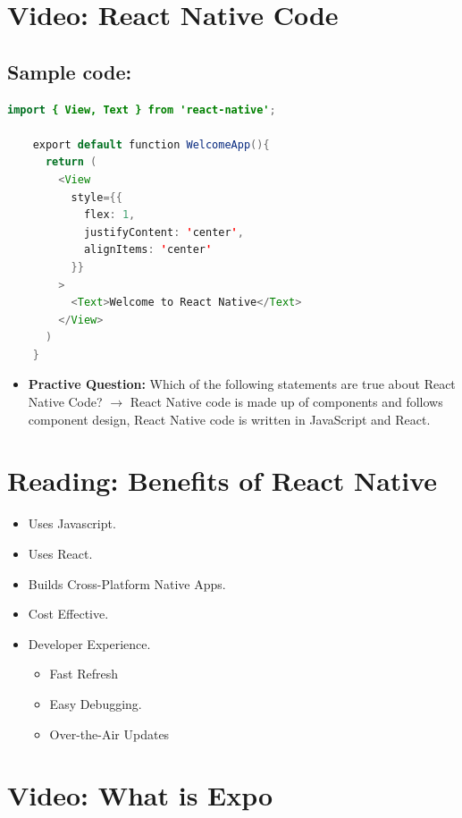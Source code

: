\section{Video: React Native Code}
\subsection{Sample code:}
\begin{lstlisting}[language=Java, numbers=none]
    import { View, Text } from 'react-native';

    export default function WelcomeApp(){
      return (
        <View
          style={{
            flex: 1,
            justifyContent: 'center',
            alignItems: 'center'
          }}
        >
          <Text>Welcome to React Native</Text>
        </View>
      )
    }
\end{lstlisting}
\begin{itemize}
    \item \textbf{Practive Question:} Which of the following statements are true about React Native Code?
    $\rightarrow$ React Native code is made up of components and follows component design, React Native code is written in JavaScript and React.
\end{itemize}

\section{Reading: Benefits of React Native}
\begin{itemize}
    \item Uses Javascript.
    \item Uses React.
    \item Builds Cross-Platform Native Apps.
    \item Cost Effective.
    \item Developer Experience.
    \begin{itemize}[label=$\circ$]
        \item Fast Refresh
        \item Easy Debugging.
        \item Over-the-Air Updates
    \end{itemize}
\end{itemize}

\section{Video: What is Expo}
